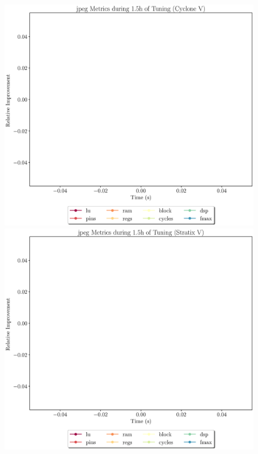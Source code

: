 \documentclass[12pt, a4paper]{article}
\begin{document}
\newpage

\begin{figure}[htpb]
    \centering
    \begin{minipage}{.48\textwidth}
        \includegraphics[scale=.29]{jpeg_all_5400_chstone_CycloneV}
    \end{minipage}%
    \hfill
    \begin{minipage}{.48\textwidth}
        \includegraphics[scale=.29]{jpeg_all_5400_chstone_StratixV}
    \end{minipage}%


\end{figure}
\end{document}
